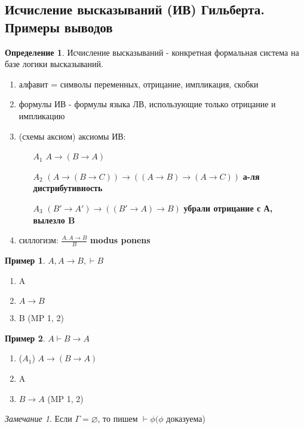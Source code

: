 \documentclass[a4paper]{article}
\theoremstyle{definition}
\newtheorem*{example}{Пример}
\newtheorem*{definition}{Определение}
\theoremstyle{remark}
\newtheorem*{remark}{Замечание}
\begin{document}
    \subsection{Исчисление высказываний (ИВ) Гильберта. Примеры выводов}
    \begin{definition}
        Исчисление высказываний - конкретная формальная система на базе логики высказываний.
        \begin{enumerate}
            \item алфавит = символы переменных, отрицание, импликация, скобки
            \item формулы ИВ -  формулы языка ЛВ, использующие только отрицание и импликацию
            \item (схемы аксиом) аксиомы ИВ:
            \begin{itemize}
                \item[$A_1$] $A\rightarrow (B\rightarrow A)$ 
                \item[$A_2$] $(A\rightarrow (B\rightarrow C))\rightarrow ((A\rightarrow B)\rightarrow (A \rightarrow C))$ \textbf{а-ля дистрибутивность}
                \item[$A_3$] $(B'\rightarrow A')\rightarrow((B'\rightarrow A)\rightarrow B)$ \textbf{убрали отрицание с А, вылезло B}
            \end{itemize}
            \item силлогизм: $\frac{A, A\rightarrow B}{B}$ \textbf{modus ponens}
        \end{enumerate}
    \end{definition}
    \begin{example}
        $A, A\rightarrow B, \vdash B$
        \begin{enumerate}
            \item A
            \item $A\rightarrow B$
            \item B (MP 1, 2)
        \end{enumerate}
    \end{example}
    \begin{example}
        $A \vdash B\rightarrow A$
        \begin{enumerate}
            \item($A_1$) $A\rightarrow (B\rightarrow A)$ 
            \item A
            \item $B\rightarrow A$ (MP 1, 2)
        \end{enumerate}
    \end{example}
    \begin{remark}
        Если $\Gamma=\varnothing$, то пишем $\vdash \phi(\phi$ доказуема)
    \end{remark}
\end{document}
